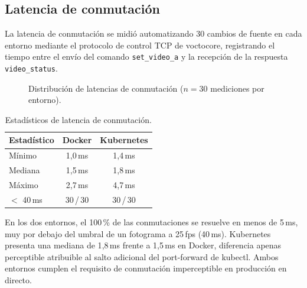 \subsection{Latencia de conmutación}
\label{sec:latencia_conmutacion}

La latencia de conmutación se midió automatizando 30 cambios de fuente en cada
entorno mediante el protocolo de control TCP de voctocore, registrando el tiempo
entre el envío del comando \texttt{set\_video\_a} y la recepción de la respuesta
\texttt{video\_status}.

\begin{figure}[H]
  \centering
  \caption{Distribución de latencias de conmutación ($n=30$ mediciones por entorno).}
  \label{fig:latencia}
\end{figure}

\begin{table}[H]
  \centering
  \caption{Estadísticos de latencia de conmutación.}
  \label{tab:latencia_stats}
  \begin{tabular}{|l|c|c|}
    \hline
    \textbf{Estadístico} & \textbf{Docker} & \textbf{Kubernetes} \\
    \hline
    Mínimo         & 1{,}0\,ms  & 1{,}4\,ms \\
    Mediana        & 1{,}5\,ms  & 1{,}8\,ms \\
    Máximo         & 2{,}7\,ms  & 4{,}7\,ms \\
    $<$ 40\,ms     & 30\,/\,30  & 30\,/\,30 \\
    \hline
  \end{tabular}
\end{table}

En los dos entornos, el 100\,\% de las conmutaciones se resuelve en menos de
5\,ms, muy por debajo del umbral de un fotograma a 25\,fps (40\,ms). Kubernetes
presenta una mediana de 1{,}8\,ms frente a 1{,}5\,ms en Docker, diferencia
apenas perceptible atribuible al salto adicional del port-forward de kubectl.
Ambos entornos cumplen el requisito de conmutación imperceptible en producción
en directo.
